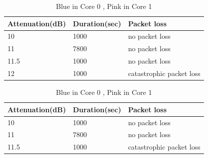 \documentclass{article}
\begin{document}
{\begin{table}[ht]
\begin{minipage}{.5\textwidth}
\begin{center}
\begin{tabular}{|p{2.5cm}|p{2.5cm}|p{2.5cm}|}
	\hline
	 Attenuation(dB) & Duration(sec) & Packet loss \\ \hline
	 10 & 1000 & no packet loss \\ \hline
	 11 & 7800 & no packet loss \\ \hline
	 11.5 & 1000 & no packet loss \\ \hline
	 12 & 1000 &  catastrophic packet loss \\ \hline
\end{tabular}
\end{center}
\caption{Pink in Core 0, Blue in Core 1}
\label{table:bluecore1}
\end{minipage}
\begin{minipage}{.5\textwidth}
\begin{center}
\begin{tabular}{|p{2.5cm}|p{2.5cm}|p{2.5cm}|}
	\hline
	 Attenuation(dB) & Duration(sec) & Packet loss \\ \hline
	 10 & 1000 & no packet loss \\ \hline
	 11 & 7800 & no packet loss \\ \hline
	 11.5 & 1000 & catastrophic packet loss \\ \hline
\end{tabular}
\end{center}
\caption{Blue in Core 0 , Pink in Core 1}
\label{table:bluecore0}
\end{minipage}
\end{table}
}
\end{document}
